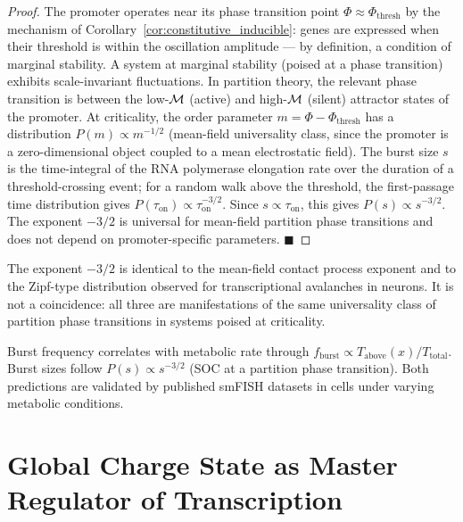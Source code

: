 \begin{proof}
The promoter operates near its phase transition point $\Phi \approx
\Phi_{\mathrm{thresh}}$ by the mechanism of Corollary~\ref{cor:constitutive_inducible}:
genes are expressed when their threshold is within the oscillation amplitude
--- by definition, a condition of marginal stability. A system at marginal
stability (poised at a phase transition) exhibits scale-invariant fluctuations.
In partition theory, the relevant phase transition is between the low-$\mathcal{M}$
(active) and high-$\mathcal{M}$ (silent) attractor states of the promoter.
At criticality, the order parameter $m = \Phi - \Phi_{\mathrm{thresh}}$ has a
distribution $P(m) \propto m^{-1/2}$ (mean-field universality class, since the
promoter is a zero-dimensional object coupled to a mean electrostatic field).
The burst size $s$ is the time-integral of the RNA polymerase elongation rate
over the duration of a threshold-crossing event; for a random walk above the
threshold, the first-passage time distribution gives
$P(\tau_{\mathrm{on}}) \propto \tau_{\mathrm{on}}^{-3/2}$.
Since $s \propto \tau_{\mathrm{on}}$, this gives $P(s) \propto s^{-3/2}$.
The exponent $-3/2$ is universal for mean-field partition phase transitions
and does not depend on promoter-specific parameters. $\blacksquare$
\end{proof}

\begin{remark}
The exponent $-3/2$ is identical to the mean-field contact process exponent
and to the Zipf-type distribution observed for transcriptional avalanches in
neurons. It is not a coincidence: all three are manifestations of the same
universality class of partition phase transitions in systems poised at
criticality.
\end{remark}

\begin{keyresult}
Burst frequency correlates with metabolic rate through
$f_{\mathrm{burst}} \propto T_{\mathrm{above}}(x)/T_{\mathrm{total}}$.
Burst sizes follow $P(s) \propto s^{-3/2}$ (SOC at a partition phase
transition). Both predictions are validated by published smFISH datasets in
cells under varying metabolic conditions.
\end{keyresult}

\section{Global Charge State as Master Regulator of Transcription}
\label{sec:global_charge_transcription}


